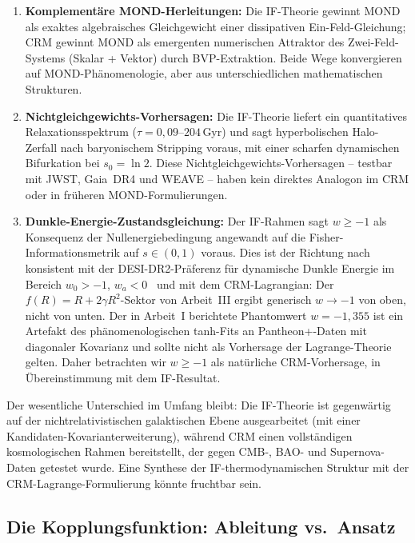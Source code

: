 \documentclass[aps,prd,twocolumn,superscriptaddress,nofootinbib]{revtex4-2}
\begin{document}
\begin{enumerate}
\item \textbf{Komplement\"are MOND-Herleitungen:} Die IF-Theorie gewinnt MOND als exaktes algebraisches Gleichgewicht einer dissipativen Ein-Feld-Gleichung; CRM gewinnt MOND als emergenten numerischen Attraktor des Zwei-Feld-Systems (Skalar + Vektor) durch BVP-Extraktion. Beide Wege konvergieren auf MOND-Ph\"anomenologie, aber aus unterschiedlichen mathematischen Strukturen.

\item \textbf{Nichtgleichgewichts-Vorhersagen:} Die IF-Theorie liefert ein quantitatives Relaxationsspektrum ($\tau = 0{,}09$--$204$\,Gyr) und sagt hyperbolischen Halo-Zerfall nach baryonischem Stripping voraus, mit einer scharfen dynamischen Bifurkation bei $s_0 = \ln 2$. Diese Nichtgleichgewichts-Vorhersagen -- testbar mit JWST, Gaia~DR4 und WEAVE -- haben kein direktes Analogon im CRM oder in fr\"uheren MOND-Formulierungen.

\item \textbf{Dunkle-Energie-Zustandsgleichung:} Der IF-Rahmen sagt $w \geq -1$ als Konsequenz der Nullenergiebedingung angewandt auf die Fisher-Informationsmetrik auf $s \in (0,1)$ voraus. Dies ist der Richtung nach konsistent mit der DESI-DR2-Pr\"aferenz f\"ur dynamische Dunkle Energie im Bereich $w_0>-1$, $w_a<0$~\cite{DESI2025} und mit dem CRM-Lagrangian: Der $f(R) = R + 2\gamma R^2$-Sektor von Arbeit~III ergibt generisch $w \to -1$ von oben, nicht von unten. Der in Arbeit~I berichtete Phantomwert $w = -1{,}355$ ist ein Artefakt des ph\"anomenologischen tanh-Fits an Pantheon+-Daten mit diagonaler Kovarianz und sollte nicht als Vorhersage der Lagrange-Theorie gelten. Daher betrachten wir $w \geq -1$ als nat\"urliche CRM-Vorhersage, in \"Ubereinstimmung mit dem IF-Resultat.
\end{enumerate}

Der wesentliche Unterschied im Umfang bleibt: Die IF-Theorie ist gegenw\"artig auf der nichtrelativistischen galaktischen Ebene ausgearbeitet (mit einer Kandidaten-Kovarianterweiterung), w\"ahrend CRM einen vollst\"andigen kosmologischen Rahmen bereitstellt, der gegen CMB-, BAO- und Supernova-Daten getestet wurde. Eine Synthese der IF-thermodynamischen Struktur mit der CRM-Lagrange-Formulierung k\"onnte fruchtbar sein.

\subsection{Die Kopplungsfunktion: Ableitung vs.\ Ansatz}
\end{document}
